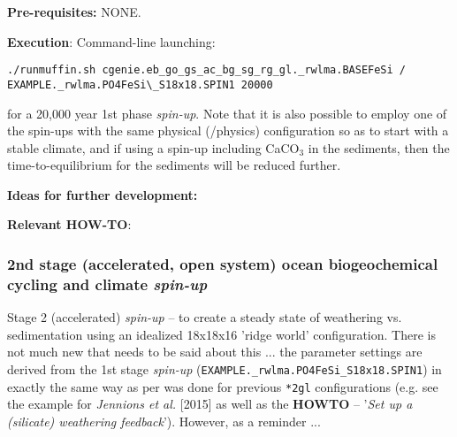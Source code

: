 \documentclass[10pt,twoside]{article}
\begin{document}
\noindent \textbf{Pre-requisites:} NONE.

\noindent \textbf{Execution}: Command-line launching:
\vspace{-5pt}\begin{verbatim}./runmuffin.sh cgenie.eb_go_gs_ac_bg_sg_rg_gl._rwlma.BASEFeSi /
EXAMPLE._rwlma.PO4FeSi\_S18x18.SPIN1 20000\end{verbatim}\vspace{-5pt}
for a 20,000 year 1st phase \textit{spin-up}. Note that it is also possible to employ one of the spin-ups with the same physical (/physics) configuration so as to start with a stable climate, and if using a spin-up including CaCO\(_{3}\) in the sediments, then the time-to-equilibrium for the sediments will be reduced further. 

\noindent \textbf{Ideas for further development:} 

\noindent \textbf{Relevant HOW-TO}:


\subsubsection{2nd stage (accelerated, open system) ocean biogeochemical cycling and climate \textit{spin-up}}\label{EXAMPLE.rwlma.PO4FeSiS18x18.SPIN2gl}

Stage 2 (accelerated) \textit{spin-up} -- to create a steady state of weathering vs. sedimentation using an idealized 18x18x16 'ridge world' configuration.
 There is not much new that needs to be said about this ... the parameter settings are derived from the 1st stage \textit{spin-up} (\texttt{EXAMPLE.\_rwlma.PO4FeSi\_S18x18.SPIN1}) in exactly the same way as per was done for previous \texttt{*2gl} configurations (e.g. see the example for \textit{Jennions et al.} [2015] as well as the \textbf{HOWTO} -- '\textit{Set up a (silicate) weathering feedback}'). However, as a reminder ...
\end{document}
